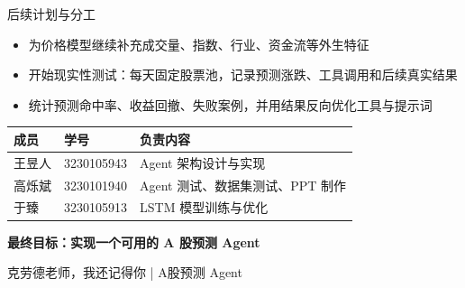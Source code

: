 \documentclass[10pt,aspectratio=43]{beamer}
\begin{document}
\begin{frame}{后续计划与分工}
  \vspace{0.3em}
  \begin{hlbox}[title=统一收尾路线]
    \footnotesize
    \begin{itemize}
      \item 为价格模型继续补充成交量、指数、行业、资金流等外生特征
      \item 开始现实性测试：每天固定股票池，记录预测涨跌、工具调用和后续真实结果
      \item 统计预测命中率、收益回撤、失败案例，并用结果反向优化工具与提示词
    \end{itemize}
  \end{hlbox}
  \vspace{0.7em}
  \begin{greenbox}[title=分工安排]
    \footnotesize
    \centering
    \renewcommand{\arraystretch}{1.4}
    \setlength{\tabcolsep}{10pt}
    \begin{tabular}{lll}
      \toprule
      \textbf{成员} & \textbf{学号} & \textbf{负责内容} \\
      \midrule
      王昱人 & 3230105943 & Agent 架构设计与实现 \\
      高烁斌 & 3230101940 & Agent 测试、数据集测试、PPT 制作 \\
      于臻   & 3230105913 & LSTM 模型训练与优化 \\

      \bottomrule
    \end{tabular}
  \end{greenbox}
  \vspace{0.6em}
  \begin{center}
    {\kaifont\large\bfseries\color{ZJUBlue}最终目标：实现一个可用的 A 股预测 Agent}
  \end{center}
\end{frame}

\begin{frame}[plain]
  \vfill
  \begin{center}
  \end{center}
  \vfill
  \begin{center}
    \small\color{AccentGray}
    克劳德老师，我还记得你 \quad | \quad A股预测 Agent
  \end{center}
  \vfill
\end{frame}
\end{document}
